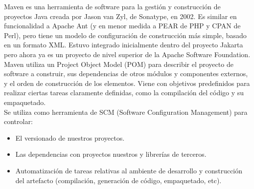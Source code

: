 Maven es una herramienta de software para la gestión y construcción de proyectos Java creada por Jason van Zyl, de Sonatype, en 2002. Es similar en funcionalidad a Apache Ant (y en menor medida a PEAR de PHP y CPAN de Perl), pero tiene un modelo de configuración de construcción más simple, basado en un formato XML. Estuvo integrado inicialmente dentro del proyecto Jakarta pero ahora ya es un proyecto de nivel superior de la Apache Software Foundation.\\

Maven utiliza un Project Object Model (POM) para describir el proyecto de software a construir, sus dependencias de otros módulos y componentes externos, y el orden de construcción de los elementos. Viene con objetivos predefinidos para realizar ciertas tareas claramente definidas, como la compilación del código y su empaquetado.\\

Se utiliza como herramienta de SCM (Software Configuration Management) para controlar:\\

\begin{itemize}
    \item El versionado de nuestros proyectos.
    \item Las dependencias con proyectos nuestros y librerías de terceros.
    \item Automatización de tareas relativas al ambiente de desarrollo y construcción del artefacto (compilación, generación de código, empaquetado, etc).
\end{itemize}